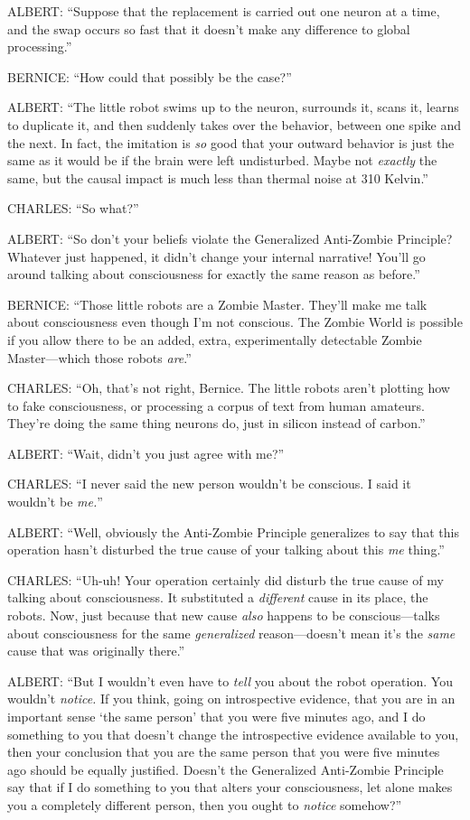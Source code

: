 {
 ALBERT: ``Suppose that the replacement is carried
out one neuron at a time, and the swap occurs so fast that it
doesn't make any difference to global
processing.''}

{
 BERNICE: ``How could that possibly be the
case?''}

{
 ALBERT: ``The little robot swims up to the
neuron, surrounds it, scans it, learns to duplicate it, and then
suddenly takes over the behavior, between one spike and the next. In
fact, the imitation is \textit{so} good that your outward behavior is
just the same as it would be if the brain were left undisturbed. Maybe
not \textit{exactly} the same, but the causal impact is much less than
thermal noise at 310 Kelvin.''}

{
 CHARLES: ``So what?''}

{
 ALBERT: ``So don't your beliefs
violate the Generalized Anti-Zombie Principle? Whatever just happened,
it didn't change your internal narrative!
You'll go around talking about consciousness for
exactly the same reason as before.''}

{
 BERNICE: ``Those little robots are a Zombie
Master. They'll make me talk about consciousness even
though I'm not conscious. The Zombie World is possible
if you allow there to be an added, extra, experimentally detectable
Zombie Master---which those robots \textit{are}.''}

{
 CHARLES: ``Oh, that's not right,
Bernice. The little robots aren't plotting how to fake
consciousness, or processing a corpus of text from human amateurs.
They're doing the same thing neurons do, just in
silicon instead of carbon.''}

{
 ALBERT: ``Wait, didn't you just
agree with me?''}

{
 CHARLES: ``I never said the new person
wouldn't be conscious. I said it
wouldn't be \textit{me.}''}

{
 ALBERT: ``Well, obviously the Anti-Zombie
Principle generalizes to say that this operation hasn't
disturbed the true cause of your talking about this \textit{me}
thing.''}

{
 CHARLES: ``Uh-uh! Your operation certainly did
disturb the true cause of my talking about consciousness. It
substituted a \textit{different} cause in its place, the robots. Now,
just because that new cause \textit{also} happens to be
conscious---talks about consciousness for the same \textit{generalized}
reason---doesn't mean it's the
\textit{same} cause that was originally there.''}

{
 ALBERT: ``But I wouldn't even
have to \textit{tell} you about the robot operation. You
wouldn't \textit{notice.} If you think, going on
introspective evidence, that you are in an important sense
`the same person' that you were five
minutes ago, and I do something to you that doesn't
change the introspective evidence available to you, then your
conclusion that you are the same person that you were five minutes ago
should be equally justified. Doesn't the Generalized
Anti-Zombie Principle say that if I do something to you that alters
your consciousness, let alone makes you a completely different person,
then you ought to \textit{notice} somehow?''}

